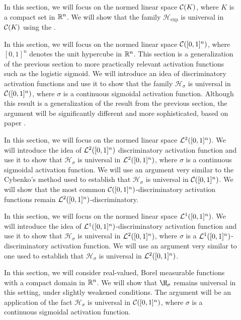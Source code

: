 \begin{description}
\item[] In this section, we will focus on the normed linear space ${\mathcal C}(K)$, where $K$ is a compact set in ${\mathbb R}^n$. We will show that the family $\mathcal{H}_{\exp}$ is universal in ${\mathcal C}(K)$ using the .
\item[] In this section, we will focus on the normed linear space ${\mathcal C}([0,1]^n)$, where $[0,1]^n$ denotes the unit hypercube in ${\mathbb R}^n$. This section is a generalization of the previous section to more practically relevant activation functions such as the logistic sigmoid. We will introduce an idea of discriminatory activation functions and use it to show that the family $\mathcal{H}_{\sigma}$ is universal in ${\mathcal C}([0,1]^n)$, where $\sigma$ is a continuous sigmoidal activation function. Although this result is a generalization of the result from the previous section, the argument will be significantly different and more sophisticated, based on paper \cite{cybenko_1989_approximation}.
\item[] In this section, we will focus on the normed linear space ${\mathcal {L}^2}([0,1]^n)$. We will introduce the idea of ${\mathcal {L}^2}([0,1]^n)$ discriminatory activation function and use it to show that $\mathcal{H}_{\sigma}$ is universal in ${\mathcal {L}^2}([0,1]^n)$, where $\sigma$ is a continuous sigmoidal activation function. We will use an argument very similar to the Cybenko's method used to establish that $\mathcal{H}_{\sigma}$ is universal in ${\mathcal C}([0,1]^n)$. We will show that the most common ${\mathcal C}([0,1]^n)$-discriminatory activation functions remain ${\mathcal {L}^2}([0,1]^n)$-discriminatory.
\item[]  In this section, we will focus on the normed linear space ${\mathcal {L}^1}([0,1]^n)$. We will introduce the idea of ${\mathcal {L}^1}([0,1]^n)$-discriminatory activation function and use it to show that $\mathcal{H}_{\sigma}$ is universal in ${\mathcal {L}^2}([0,1]^n)$, where $\sigma$ is a ${\mathcal {L}^1}([0,1]^n)$-discriminatory activation function. We will use an argument very similar to one used to establish that $\mathcal{H}_{\sigma}$ is universal in ${\mathcal {L}^2}([0,1]^n)$.
\item[] In this section, we will consider real-valued, Borel measurable functions with a compact domain in ${\mathbb R}^n$. We will show that $\H_\sigma$ remains universal in this setting, under slightly weakened conditions. The argument will be an application of the fact $\mathcal{H}_{\sigma}$ is universal in ${\mathcal C}([0,1]^n)$, where $\sigma$ is a continuous sigmoidal activation function.

\end{description}

